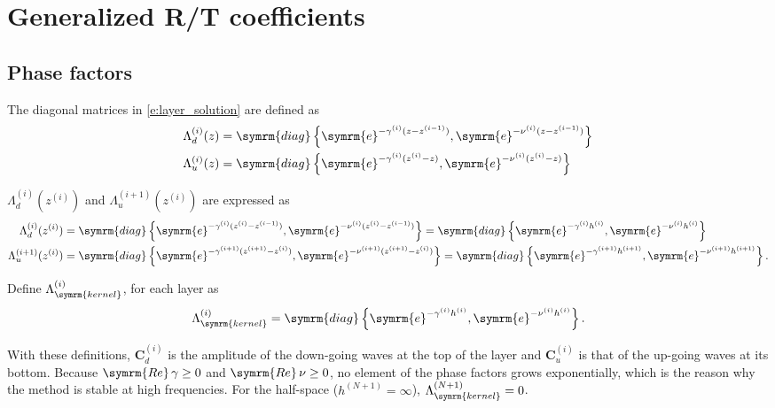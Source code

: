 \documentclass[a4paper, 10pt]{article}
\begin{document}
\section{Generalized R/T coefficients}

\subsection{Phase factors}

The diagonal matrices in \eqref{e:layer_solution} are defined as
\begin{align}
  \Lambda_d^{(i)}(z) &= \symrm{diag}\left\{
  \symrm{e}^{-\gamma^{(i)} (z - z^{(i - 1)})},
  \symrm{e}^{-\nu^{(i)} (z - z^{(i - 1)})}
  \right\} 
  \\
  \Lambda_u^{(i)}(z) &= \symrm{diag}\left\{ 
  \symrm{e}^{-\gamma^{(i)}(z^{(i)} - z)},
  \symrm{e}^{-\nu^{(i)}(z^{(i)} - z)}
  \right\}
\end{align}

$\Lambda_d^{(i)}(z^{(i)})$ and $\Lambda_u^{(i + 1)}(z^{(i)})$ are expressed as
\begin{align}
  \Lambda_d^{(i)}(z^{(i)}) 
  &= 
  \symrm{diag}\left\{ 
  \symrm{e}^{-\gamma^{(i)}(z^{(i)} - z^{(i - 1)})},
  \symrm{e}^{-\nu^{(i)}(z^{(i)} - z^{(i - 1)})}
  \right\}  
  = 
  \symrm{diag}\left\{ 
  \symrm{e}^{-\gamma^{(i)}h^{(i)}},
  \symrm{e}^{-\nu^{(i)}h^{(i)}}
  \right\}  
  \\
  \Lambda_u^{(i + 1)}(z^{(i)}) 
  &= 
  \symrm{diag}\left\{ 
  \symrm{e}^{-\gamma^{(i + 1)}(z^{(i + 1)} - z^{(i)})},
  \symrm{e}^{-\nu^{(i + 1)}(z^{(i + 1)} - z^{(i)})}
  \right\}
  =
  \symrm{diag}\left\{ 
  \symrm{e}^{-\gamma^{(i + 1)}h^{(i + 1)}},
  \symrm{e}^{-\nu^{(i + 1)}h^{(i + 1)}}
  \right\}.
\end{align}

Define $\Lambda_{\symrm{kernel}}^{(i)}$, for each layer as
\begin{align}
  \Lambda_{\symrm{kernel}}^{(i)} = 
  \symrm{diag}\left\{ 
  \symrm{e}^{-\gamma^{(i)}h^{(i)}},
  \symrm{e}^{-\nu^{(i)}h^{(i)}}
  \right\}.  
\end{align}

With these definitions, $\symbf{C}_d^{(i)}$ is the amplitude of the down-going waves at the top of the layer and $\symbf{C}_u^{(i)}$ is that of the up-going waves at its bottom.
Because $\symrm{Re}\,\gamma \geq 0$ and $\symrm{Re}\,\nu \geq 0$, no element of the phase factors grows exponentially, which is the reason why the method is stable at high frequencies.
For the half-space ($h^{(N + 1)} = \infty$), $\Lambda_{\symrm{kernel}}^{(N + 1)} = 0$.
\end{document}
